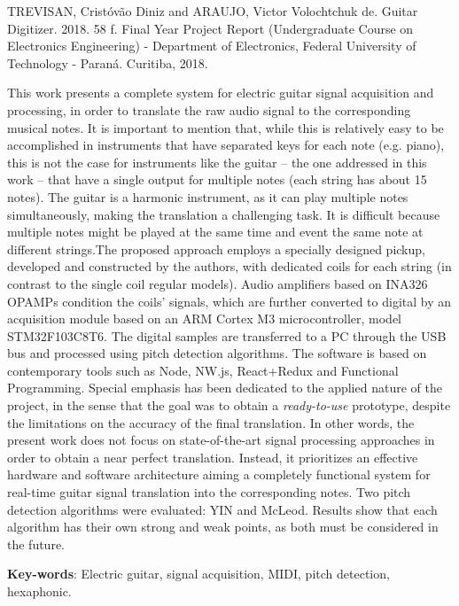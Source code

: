 \setlength{\absparsep}{18pt} %

\begin{summary}[Abstract]
	TREVISAN, Cristóvão Diniz and ARAUJO, Victor Volochtchuk de.
	Guitar Digitizer. 2018. 58 f. Final Year Project Report
	(Undergraduate Course on Electronics Engineering) - Department of Electronics,
	Federal University of Technology - Paraná. Curitiba, 2018.


	This work presents a complete system for electric guitar signal acquisition and processing, in order to translate
	the raw audio signal to the corresponding musical notes. It is important to mention that, while this is
	relatively easy to be accomplished in instruments that have separated keys for each note (e.g. piano),
	this is not the case for instruments like the guitar – the one addressed in this work – that have a single
	output for multiple notes (each string has about 15 notes). The guitar is a harmonic instrument, as it can
	play multiple notes simultaneously, making the translation a challenging task. It is difficult because
	multiple notes might be played at the same time and event the same note at different strings.The proposed
	approach employs a specially designed pickup, developed and constructed by the authors, with dedicated coils for
	each string (in contrast to the single coil regular models). Audio amplifiers based on INA326 OPAMPs
	condition the coils’ signals, which are further converted to digital by an acquisition module based on an
	ARM Cortex M3 microcontroller, model STM32F103C8T6. The digital samples are transferred to a PC
	through the USB bus and processed using pitch detection algorithms. The software is based on
	contemporary tools such as Node, NW.js, React+Redux and Functional Programming. Special emphasis
	has been dedicated to the applied nature of the project, in the sense that the goal was to obtain a
	\emph{ready-to-use} prototype, despite the limitations on the accuracy of the final translation. In other
	words, the present work does not focus on state-of-the-art signal processing approaches in order to
	obtain a near perfect translation. Instead, it prioritizes an effective hardware and software architecture
	aiming a completely functional system for real-time guitar signal translation into the corresponding
	notes. Two pitch detection algorithms were evaluated: YIN and McLeod. Results show that each algorithm
	has their own strong and weak points, as both must be considered in the future.


	\textbf{Key-words}: Electric guitar, signal acquisition, MIDI, pitch detection, hexaphonic.
\end{summary}

